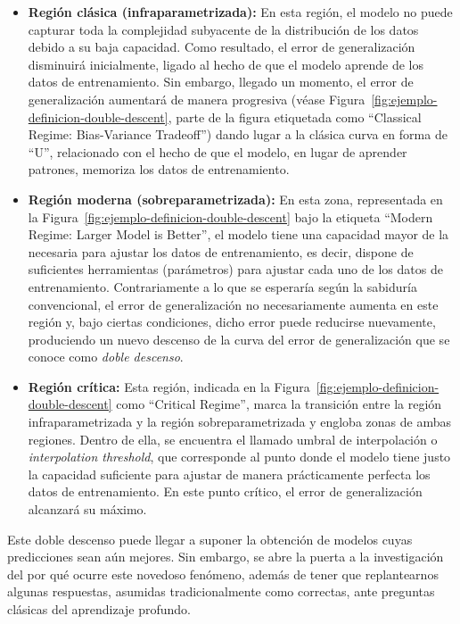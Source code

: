 \begin{itemize}
    \item \textbf{Región clásica (infraparametrizada):} En esta región, el modelo no puede capturar toda la complejidad subyacente de la distribución de los datos debido a su baja capacidad. Como resultado, el error de generalización disminuirá inicialmente, ligado al hecho de que el modelo aprende de los datos de entrenamiento. Sin embargo, llegado un momento, el error de generalización aumentará de manera progresiva (véase Figura~\ref{fig:ejemplo-definicion-double-descent}, parte de la figura etiquetada como ``Classical Regime: Bias-Variance Tradeoff'') dando lugar a la clásica curva en forma de ``U'', relacionado con el hecho de que el modelo, en lugar de aprender patrones, memoriza los datos de entrenamiento.

    \item \textbf{Región moderna (sobreparametrizada):} En esta zona, representada en la Figura~\ref{fig:ejemplo-definicion-double-descent} bajo la etiqueta ``Modern Regime: Larger Model is Better'', el modelo tiene una capacidad mayor de la necesaria para ajustar los datos de entrenamiento, es decir, dispone de suficientes herramientas (parámetros) para ajustar cada uno de los datos de entrenamiento. Contrariamente a lo que se esperaría según la sabiduría convencional, el error de generalización no necesariamente aumenta en este región y, bajo ciertas condiciones, dicho error puede reducirse nuevamente, produciendo un nuevo descenso de la curva del error de generalización que se conoce como \emph{doble descenso}.
    
    \item \textbf{Región crítica:} Esta región, indicada en la Figura~\ref{fig:ejemplo-definicion-double-descent} como ``Critical Regime'', marca la transición entre la región infraparametrizada y la región sobreparametrizada y engloba zonas de ambas regiones. Dentro de ella, se encuentra el llamado umbral de interpolación o \textit{interpolation threshold}, que corresponde al punto donde el modelo tiene justo la capacidad suficiente para ajustar de manera prácticamente perfecta los datos de entrenamiento. En este punto crítico, el error de generalización alcanzará su máximo.\newline
       
\end{itemize}

Este doble descenso puede llegar a suponer la obtención de modelos cuyas predicciones sean aún mejores. Sin embargo, se abre la puerta a la investigación del por qué ocurre este novedoso fenómeno, además de tener que replantearnos algunas respuestas, asumidas tradicionalmente como correctas, ante preguntas clásicas del aprendizaje profundo.\newline

